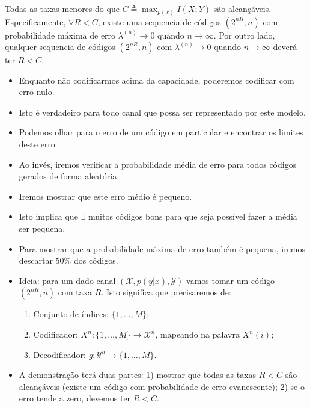 \begin{frame}[allowframebreaks]
  \begin{theorem}
  Todas as taxas menores do que $C \triangleq \max_{p(x)} I(X;Y)$ são alcançáveis. Especificamente,
  $\forall R < C$, existe uma sequencia de códigos $(2^{nR},n)$ com probabilidade máxima de erro 
  $\lambda^{(n)} \rightarrow 0$ quando $n \rightarrow \infty$. Por outro lado, qualquer sequencia 
  de códigos $(2^{nR},n)$ com $\lambda^{(n)} \rightarrow 0$ quando $n \rightarrow \infty$ 
  deverá ter $R < C$.
  \end{theorem}

  \begin{itemize}
  \item Enquanto não codificarmos acima da capacidade, poderemos codificar com erro nulo.
  \item Isto é verdadeiro para todo canal que possa ser representado por este modelo.
  \end{itemize}

  \framebreak

  \begin{itemize}
  \item Podemos olhar para o erro de um código em particular e encontrar os limites deste erro.
  \item Ao invés, iremos verificar a probabilidade média de erro para todos códigos gerados de forma aleatória.
  \item Iremos mostrar que este erro médio é pequeno.
  \item Isto implica que $\exists$ muitos códigos bons para que seja possível fazer a média ser pequena.
  \item Para mostrar que a probabilidade máxima de erro também é pequena, iremos descartar 50\% dos códigos.
  \item Ideia: para um dado canal $\left( \mathcal{X}, p(y|x), \mathcal{Y} \right)$ vamos tomar um código
	$(2^{nR},n)$ com taxa $R$. Isto significa que precisaremos de:
	\begin{enumerate}
	\item Conjunto de índices: $\{1, \ldots, M\}$;
	\item Codificador: $X^n: \{1, \ldots, M\} \rightarrow \mathcal{X}^n$, mapeando na palavra $X^n(i)$;
	\item Decodificador: $g: \mathcal{Y}^n \rightarrow \{1, \ldots, M\}$.
	\end{enumerate}
  \item A demonstração terá duas partes: 1) mostrar que todas as taxas $R < C$ são alcançáveis 
	(existe um código com probabilidade de erro evanescente); 2) se o erro tende a zero,
	devemos ter $R < C$. 
  \end{itemize}


\end{frame}
